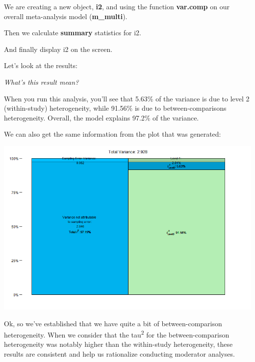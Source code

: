 \documentclass[
]{book}
\newenvironment{Shaded}{\begin{snugshade}}{\end{snugshade}}
\newcommand{\DecValTok}[1]{\textcolor[rgb]{0.00,0.00,0.81}{#1}}
\newcommand{\FloatTok}[1]{\textcolor[rgb]{0.00,0.00,0.81}{#1}}
\newcommand{\NormalTok}[1]{#1}
\newcommand{\SpecialCharTok}[1]{\textcolor[rgb]{0.81,0.36,0.00}{\textbf{#1}}}
\begin{document}
We are creating a new object, \textbf{i2}, and using the function \textbf{var.comp} on our overall meta-analysis model (\textbf{m\_multi}).

Then we calculate \textbf{summary} statistics for i2.

And finally display i2 on the screen.

Let's look at the results:

\begin{Shaded}
\end{Shaded}

\emph{What's this result mean?}

When you run this analysis, you'll see that 5.63\% of the variance is due to level 2 (within-study) heterogeneity, while 91.56\% is due to between-comparisons heterogeneity. Overall, the model explains 97.2\% of the variance.

We can also get the same information from the plot that was generated:

\includegraphics[width=1\textwidth,height=\textheight]{images/i2plot.png}

Ok, so we've established that we have quite a bit of between-comparison heterogeneity. When we consider that the tau\textsuperscript{2} for the between-comparison heterogeneity was notably higher than the within-study heterogeneity, these results are consistent and help us rationalize conducting moderator analyses.
\end{document}
